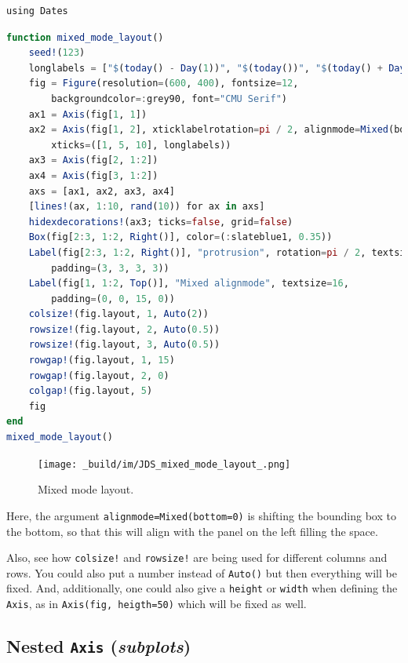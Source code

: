 \documentclass[
  notoc %
]{tufte-book}
\newcommand{\passthrough}[1]{#1}
\begin{document}
\begin{lstlisting}
using Dates
\end{lstlisting}

\begin{lstlisting}[language=Julia]
function mixed_mode_layout()
    seed!(123)
    longlabels = ["$(today() - Day(1))", "$(today())", "$(today() + Day(1))"]
    fig = Figure(resolution=(600, 400), fontsize=12,
        backgroundcolor=:grey90, font="CMU Serif")
    ax1 = Axis(fig[1, 1])
    ax2 = Axis(fig[1, 2], xticklabelrotation=pi / 2, alignmode=Mixed(bottom=0),
        xticks=([1, 5, 10], longlabels))
    ax3 = Axis(fig[2, 1:2])
    ax4 = Axis(fig[3, 1:2])
    axs = [ax1, ax2, ax3, ax4]
    [lines!(ax, 1:10, rand(10)) for ax in axs]
    hidexdecorations!(ax3; ticks=false, grid=false)
    Box(fig[2:3, 1:2, Right()], color=(:slateblue1, 0.35))
    Label(fig[2:3, 1:2, Right()], "protrusion", rotation=pi / 2, textsize=14,
        padding=(3, 3, 3, 3))
    Label(fig[1, 1:2, Top()], "Mixed alignmode", textsize=16,
        padding=(0, 0, 15, 0))
    colsize!(fig.layout, 1, Auto(2))
    rowsize!(fig.layout, 2, Auto(0.5))
    rowsize!(fig.layout, 3, Auto(0.5))
    rowgap!(fig.layout, 1, 15)
    rowgap!(fig.layout, 2, 0)
    colgap!(fig.layout, 5)
    fig
end
mixed_mode_layout()
\end{lstlisting}

\begin{figure}
\hypertarget{fig:mixed_mode_layout}{%
\centering
\texttt{[image: \_build/im/JDS\_mixed\_mode\_layout\_.png]}
\caption{Mixed mode layout.}\label{fig:mixed_mode_layout}
}
\end{figure}

Here, the argument \passthrough{\lstinline!alignmode=Mixed(bottom=0)!}
is shifting the bounding box to the bottom, so that this will align with
the panel on the left filling the space.

Also, see how \passthrough{\lstinline"colsize!"} and
\passthrough{\lstinline"rowsize!"} are being used for different columns
and rows. You could also put a number instead of
\passthrough{\lstinline!Auto()!} but then everything will be fixed. And,
additionally, one could also give a \passthrough{\lstinline!height!} or
\passthrough{\lstinline!width!} when defining the
\passthrough{\lstinline!Axis!}, as in
\passthrough{\lstinline!Axis(fig, heigth=50)!} which will be fixed as
well.

\hypertarget{nested-axis-subplots}{%
\subsection{\texorpdfstring{Nested \texttt{Axis}
(\emph{subplots})}{Nested Axis (subplots)}}\label{nested-axis-subplots}}
\end{document}
